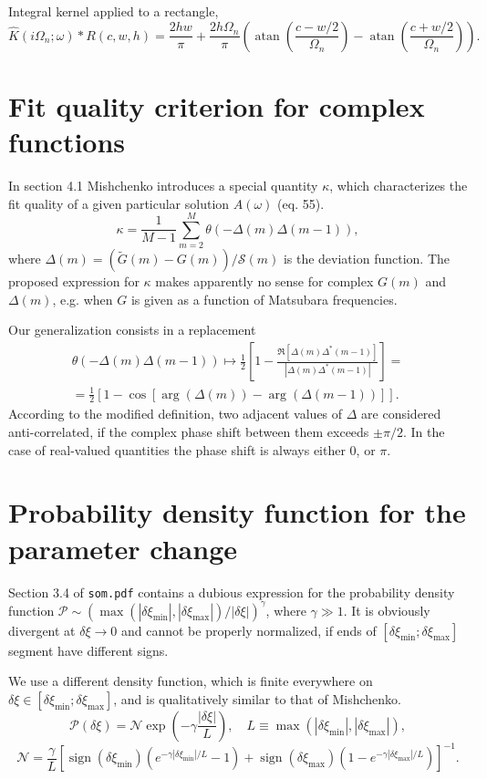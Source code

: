 \documentclass[]{article}
\DeclareMathOperator{\atan}{atan}
\DeclareMathOperator{\sign}{sign}
\begin{document}
Integral kernel applied to a rectangle,
\begin{equation}
\hat K(i\Omega_n;\omega)*R(c,w,h) = 
\frac{2hw}{\pi} + \frac{2h\Omega_n}{\pi}\left(
\atan\left(\frac{c-w/2}{\Omega_n}\right) - \atan\left(\frac{c+w/2}{\Omega_n}\right)
\right).
\end{equation}

\section{Fit quality criterion for complex functions}

In section 4.1 Mishchenko introduces a special quantity $\kappa$, which characterizes the fit quality of a given particular solution
$A(\omega)$ (eq. 55).
\begin{equation}
	\kappa = \frac{1}{M-1}\sum_{m=2}^M\theta(-\Delta(m)\Delta(m-1)),
\end{equation}
where $\Delta(m) = (\tilde G(m) - G(m))/\mathcal{S}(m)$ is the deviation function. The proposed expression for $\kappa$ makes  apparently no sense for complex $G(m)$ and $\Delta(m)$, e.g. when $G$ is given as a function of Matsubara frequencies.

Our generalization consists in a replacement
\begin{multline}
	\theta(-\Delta(m)\Delta(m-1)) \mapsto
	\frac{1}{2}\left[1 - \frac{\Re[\Delta(m)\Delta^*(m-1)]}{|\Delta(m)\Delta^*(m-1)|} \right]=\\=
	\frac{1}{2}\left[ 1 - \cos[\arg(\Delta(m)) - \arg(\Delta(m-1))] \right].
\end{multline}
According to the modified definition, two adjacent values of $\Delta$ are considered anti-correlated, if the complex phase shift between them exceeds $\pm\pi/2$. In the case of real-valued quantities the phase shift is always either 0, or $\pi$.

\section{Probability density function for the parameter change}

Section 3.4 of \verb|som.pdf| contains a dubious expression for the probability
density function $\mathcal{P}\sim (\max(|\delta\xi_\mathrm{min}|, |\delta\xi_\mathrm{max}|)/|\delta\xi|)^\gamma$, where $\gamma\gg1$. It is
obviously divergent at $\delta\xi\to0$ and cannot be properly normalized, if
ends of $[\delta\xi_\mathrm{min};\delta\xi_\mathrm{max}]$ segment have different signs.

We use a different density function, which is finite everywhere on $\delta\xi\in[\delta\xi_\mathrm{min};\delta\xi_\mathrm{max}]$, and is qualitatively similar to that of Mishchenko.
\begin{equation}
	\mathcal{P}(\delta\xi) = \mathcal{N}
	\exp\left(-\gamma \frac{|\delta\xi|}{L}\right), \quad
	L \equiv \max(|\delta\xi_\mathrm{min}|, |\delta\xi_\mathrm{max}|),
\end{equation}
\begin{equation}
	\mathcal{N} = \frac{\gamma}{L}\left[
		\sign(\delta\xi_\mathrm{min})(e^{-\gamma|\delta\xi_\mathrm{min}|/L} - 1) +
		\sign(\delta\xi_\mathrm{max})(1 - e^{-\gamma|\delta\xi_\mathrm{max}|/L})
	\right]^{-1}.
\end{equation}
\end{document}
